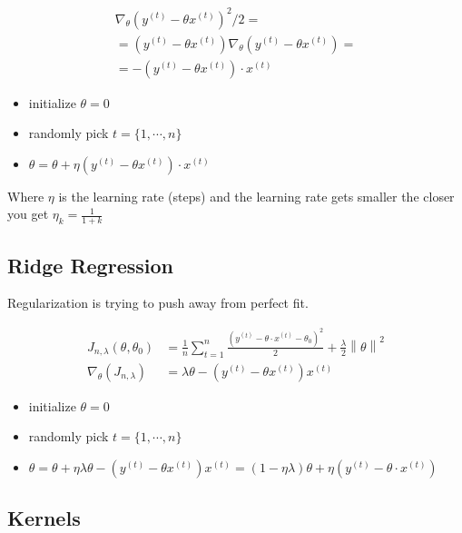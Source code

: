 \begin{align*}
\nabla_{\theta}(y^{(t)} - \theta x^{(t)})^2 / 2 =\\
= (y^{(t)} - \theta x^{(t)}) \nabla_{\theta}(y^{(t)} - \theta x^{(t)}) = \\
= -(y^{(t)} - \theta x^{(t)}) \cdot x^{(t)}
\end{align*}


\begin{itemize}
\item initialize $\theta=0$
\item randomly pick $t=\{1,\cdots,n\}$
\item $\theta = \theta + \eta(y^{(t)} - \theta x^{(t)}) \cdot x^{(t)}$
\end{itemize}

Where $\eta$ is the learning rate (steps) and the learning rate gets smaller the closer you get $\eta_k = \frac{1}{1+k}$ 

\subsection{Ridge Regression}
Regularization is trying to push away from perfect fit.

\begin{align*}
J_{n, \lambda } (\theta , \theta _0) &= \frac{1}{n} \sum _{t=1}^{n} \frac{(y^{(t)} - \theta \cdot x^{(t)}-\theta _0)^2}{2} + \frac{\lambda }{2} \left\|  \theta  \right\| ^2\\
\nabla_{\theta}(J_{n, \lambda })&= \lambda \theta - (y^{(t)}-\theta x^{(t)})x^{(t)}
\end{align*}

\begin{itemize}
\item initialize $\theta=0$
\item randomly pick $t=\{1,\cdots,n\}$
\item $\theta = \theta + \eta\lambda \theta - (y^{(t)}-\theta x^{(t)})x^{(t)} = (1-\eta \lambda)\theta + \eta(y^{(t)}-\theta \cdot x^{(t)})$
\end{itemize}

\subsection{Kernels}

